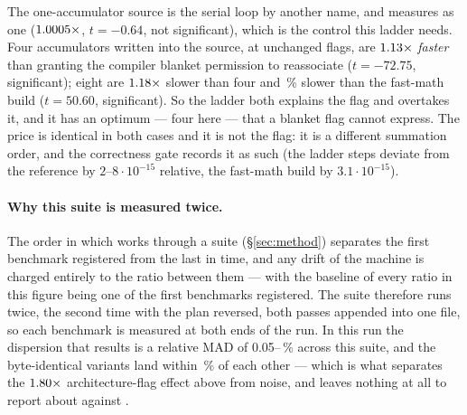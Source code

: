 \noindent
The one-accumulator source is the serial  loop by another name, and measures as one
($\meas{ratio:b1_flags-314:arraysum/O2|b1_flags-314:arraysum/accum_acc1}{1.0005}\times$, $t=-0.64$, not significant), which is the control this ladder needs. Four
accumulators written into the source, at unchanged flags, are $\meas{ratio:b1_flags-314:arraysum/O3native_ffast|b1_flags-314:arraysum/accum_acc4}{1.13}\times$ \emph{faster} than
granting the compiler blanket permission to reassociate ($t=-72.75$, significant); eight are
$\meas{ratio:b1_flags-314:arraysum/accum_acc8|b1_flags-314:arraysum/accum_acc4}{1.18}\times$ slower than four and \,\% slower than the fast-math build ($t=50.60$,
significant). So the ladder both explains the flag and overtakes it, and it has an optimum ---
four here --- that a blanket flag cannot express. The price is identical in both cases and it is
not the flag: it is a different summation order, and the correctness gate records it as such
(the ladder steps deviate from the reference by $2$--$8\cdot10^{-15}$ relative, the fast-math
build by $3.1\cdot10^{-15}$).

\paragraph{Why this suite is measured twice.} The order in which  works through a
suite (\S\ref{sec:method}) separates the first benchmark registered from the last in time, and
any drift of the machine is charged entirely to the
ratio between them --- with the baseline of every ratio in this figure being one of the first
benchmarks registered. The suite therefore runs twice, the second time with the plan reversed,
both passes appended into one file, so each benchmark is measured at both ends of the run. In
this run the dispersion that results is a relative MAD of 0.05--\,\% across this suite,
and the byte-identical variants land within \,\% of each other --- which is what
separates the $\meas{ratio:b1_flags-314:matmul/O3native|b1_flags-314:matmul/O2}{1.80}\times$ architecture-flag effect above from noise, and leaves nothing at all
to report about  against .

